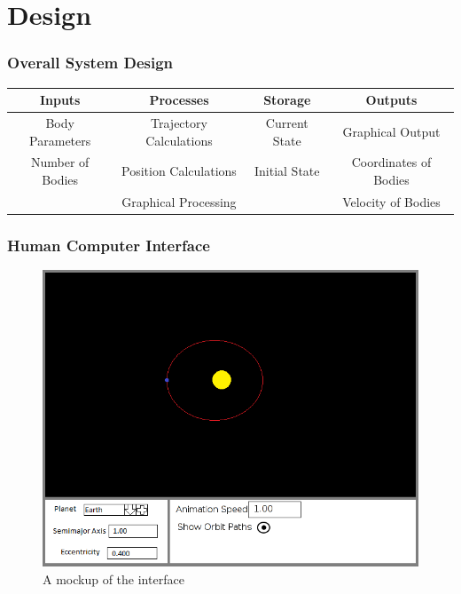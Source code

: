 \part{Design}

\section{Overall System Design}

\begin{tabular}{|c|c|c|c|}
	\hline
	Inputs & Processes & Storage & Outputs \\ \hline
	Body Parameters & Trajectory Calculations 
		& Current State & Graphical Output \\
	Number of Bodies & Position Calculations 
		& Initial State & Coordinates of Bodies \\ 
	& Graphical Processing && Velocity of Bodies \\\hline
	

	
\end{tabular}

\section{Human Computer Interface}

\begin{figure}[h!]
	\includegraphics[width=\textwidth]{./img/interface.png}
	\caption{A mockup of the interface}
	\label{fig:hci}
\end{figure}

